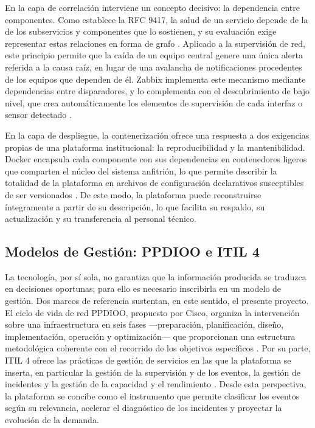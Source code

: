 En la capa de correlación interviene un concepto decisivo: la dependencia entre componentes. Como establece la RFC 9417, la salud de un servicio depende de la de los subservicios y componentes que lo sostienen, y su evaluación exige representar estas relaciones en forma de grafo \cite{claise2023sain}. Aplicado a la supervisión de red, este principio permite que la caída de un equipo central genere una única alerta referida a la causa raíz, en lugar de una avalancha de notificaciones procedentes de los equipos que dependen de él. Zabbix implementa este mecanismo mediante dependencias entre disparadores, y lo complementa con el descubrimiento de bajo nivel, que crea automáticamente los elementos de supervisión de cada interfaz o sensor detectado \cite{zabbix2024manual}.

En la capa de despliegue, la contenerización ofrece una respuesta a dos exigencias propias de una plataforma institucional: la reproducibilidad y la mantenibilidad. Docker encapsula cada componente con sus dependencias en contenedores ligeros que comparten el núcleo del sistema anfitrión, lo que permite describir la totalidad de la plataforma en archivos de configuración declarativos susceptibles de ser versionados \cite{merkel2014docker}. De este modo, la plataforma puede reconstruirse íntegramente a partir de su descripción, lo que facilita su respaldo, su actualización y su transferencia al personal técnico.

\subsection{Modelos de Gestión: PPDIOO e ITIL 4}

La tecnología, por sí sola, no garantiza que la información producida se traduzca en decisiones oportunas; para ello es necesario inscribirla en un modelo de gestión. Dos marcos de referencia sustentan, en este sentido, el presente proyecto. El ciclo de vida de red PPDIOO, propuesto por Cisco, organiza la intervención sobre una infraestructura en seis fases ---preparación, planificación, diseño, implementación, operación y optimización--- que proporcionan una estructura metodológica coherente con el recorrido de los objetivos específicos \cite{teare2007desgn}. Por su parte, ITIL 4 ofrece las prácticas de gestión de servicios en las que la plataforma se inserta, en particular la gestión de la supervisión y de los eventos, la gestión de incidentes y la gestión de la capacidad y el rendimiento \cite{axelos2019itil}. Desde esta perspectiva, la plataforma se concibe como el instrumento que permite clasificar los eventos según su relevancia, acelerar el diagnóstico de los incidentes y proyectar la evolución de la demanda.

